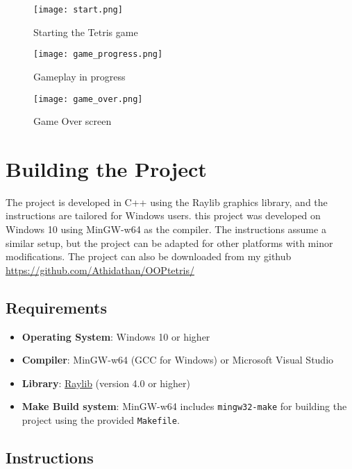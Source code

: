 \documentclass{article}
\begin{document}
\begin{figure}[H]
    \centering
    \texttt{[image: start.png]}
    \caption{Starting the Tetris game}
    \label{fig:screenshot_start}
\end{figure}

\begin{figure}[H]
    \centering
    \texttt{[image: game\_progress.png]}
    \caption{Gameplay in progress}
    \label{fig:screenshot_gameplay}
\end{figure}

\begin{figure}[H]
    \centering
    \texttt{[image: game\_over.png]}
    \caption{Game Over screen}
    \label{fig:screenshot_gameover}
\end{figure}
\section{Building the Project}

The project is developed in C++ using the Raylib graphics library, and the instructions are tailored for Windows users.
this project was developed on Windows 10 using MinGW-w64 as the compiler. The instructions assume a similar setup, but the project can be adapted for other platforms with minor modifications. The project can also be downloaded from my github \url{https://github.com/Athidathan/OOPtetris/}

\subsection{Requirements}

\begin{itemize}
    \item \textbf{Operating System}: Windows 10 or higher
    \item \textbf{Compiler}: MinGW-w64 (GCC for Windows) or Microsoft Visual Studio
    \item \textbf{Library}: \href{https://www.raylib.com/}{Raylib} (version 4.0 or higher)
     \item \textbf{Make Build system}: MinGW-w64 includes \texttt{mingw32-make} for building the project using the provided \texttt{Makefile}.
\end{itemize}

\subsection{Instructions}
\end{document}
